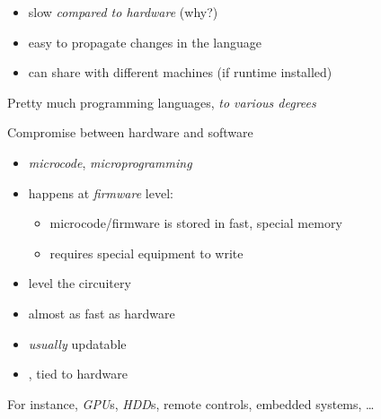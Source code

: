 \documentclass[10pt]{beamer}
\begin{document}
\begin{frame}{}
  \begin{itemize}
    \item slow \emph{compared to hardware} (why?)
    \item easy to propagate changes in the language
    \item can share with different machines (if runtime installed)
  \end{itemize}
  \bigskip
  Pretty much  programming languages,
  \emph{to various degrees}
\end{frame}





\begin{frame}{}
  Compromise between hardware and software
  \begin{itemize}
    \item \emph{microcode},  \emph{microprogramming}
    \item happens at \emph{firmware} level:
      \begin{itemize}
        \item microcode/firmware is stored in fast, special memory
        \item requires special equipment to write
      \end{itemize}
    \item level  the circuitery
  \end{itemize}
  \bigskip
  \pause
  \begin{itemize}
    \item almost as fast as hardware
    \item \emph{usually} updatable
    \item {}, tied to hardware
  \end{itemize}
  \bigskip
  \pause
  For instance, \emph{GPU}s, \emph{HDD}s, remote controls, embedded systems,
  \ldots
\end{frame}
\end{document}
